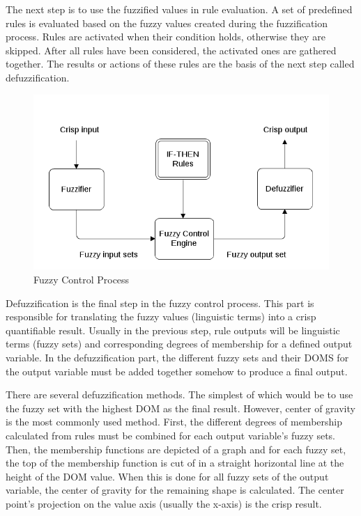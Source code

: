 The next step is to use the fuzzified values in rule evaluation. A set of predefined rules is evaluated based on the fuzzy values created during the fuzzification process. Rules are activated when their condition holds, otherwise they are skipped. After all rules have been considered, the activated ones are gathered together. The results or actions of these rules are the basis of the next step called defuzzification.

\begin{figure}[h]
\centering
\includegraphics[scale=0.6]{2/figures/fuzzy_control_engine.png}
\caption{Fuzzy Control Process \cite{fuzzy_logic_offloading}}
\label{fuzzy_control_process}
\end{figure}

Defuzzification is the final step in the fuzzy control process. This part is responsible for translating the fuzzy values (linguistic terms) into a crisp quantifiable result. Usually in the previous step, rule outputs will be linguistic terms (fuzzy sets) and corresponding degrees of membership for a defined output variable. In the defuzzification part, the different fuzzy sets and their DOMS for the output variable must be added together somehow to produce a final output. 

There are several defuzzification methods. The simplest of which would be to use the fuzzy set with the highest DOM as the final result. However, center of gravity is the most commonly used method. First, the different degrees of membership calculated from rules must be combined for each output variable's fuzzy sets. Then, the membership functions are depicted of a graph and for each fuzzy set, the top of the membership function is cut of in a straight horizontal line at the height of the DOM value. When this is done for all fuzzy sets of the output variable, the center of gravity for the remaining shape is calculated. The center point's projection on the value axis (usually the x-axis) is the crisp result.


